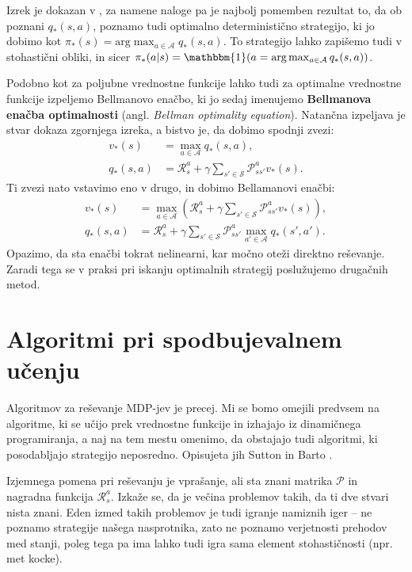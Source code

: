 \documentclass[12pt,a4paper]{amsart}
\theoremstyle{definition} %
\theoremstyle{plain} %
\begin{document}
Izrek je dokazan v \cite{RLalgo}, za namene naloge pa je najbolj pomemben rezultat to, da ob poznani 
$q_*(s, a)$, poznamo tudi optimalno deterministično strategijo, ki jo dobimo kot $\pi_*(s) = 
\text{arg}\max_{a \in \mathcal{A}} q_*(s, a)$. To strategijo lahko zapišemo tudi v stohastični obliki, 
in sicer $\pi_*(a|s) = \mathbbm{1} (a =\text{arg}\max_{a \in \mathcal{A}} q_*(s, a))$.

Podobno kot za poljubne vrednostne funkcije lahko tudi za optimalne vrednostne funkcije 
izpeljemo Bellmanovo enačbo, ki jo sedaj imenujemo \textbf{Bellmanova enačba optimalnosti} (angl. 
\textit{Bellman optimality equation}). Natančna izpeljava je stvar dokaza zgornjega izreka, a bistvo je, 
da dobimo spodnji zvezi:
\begin{align*}
    v_*(s) &= \max_{a \in \mathcal{A}} q_*(s, a), \\
    q_*(s, a) &= \mathcal{R}_s^a + \gamma \sum_{s' \in \mathcal{S}} \mathcal{P}_{ss'}^a v_*(s).
\end{align*}
Ti zvezi nato vstavimo eno v drugo, in dobimo Bellamanovi enačbi: 
\begin{align*}
    v_*(s) &= \max_{a \in \mathcal{A}} (\mathcal{R}_s^a + \gamma \sum_{s' \in \mathcal{S}} \mathcal{P}_{ss'}^a v_*(s)), \\
    q_*(s, a) &= \mathcal{R}_s^a + 
                \gamma \sum_{s' \in \mathcal{S}} \mathcal{P}_{ss'}^a \max_{a' \in \mathcal{A}} q_*(s', a').
\end{align*}
Opazimo, da sta enačbi tokrat nelinearni, kar močno oteži direktno reševanje. Zaradi tega se v praksi 
pri iskanju optimalnih strategij poslužujemo drugačnih metod.

\section{Algoritmi pri spodbujevalnem učenju}\label{algo}
\label{algoritmi}
Algoritmov za reševanje MDP-jev je precej. Mi se bomo omejili predvsem na algoritme, ki se učijo 
prek vrednostne funkcije in izhajajo iz dinamičnega programiranja, a naj na tem mestu omenimo, 
da obstajajo tudi algoritmi, ki posodabljajo strategijo neposredno. Opisujeta jih Sutton in Barto 
\cite{RLintro}.

Izjemnega pomena pri reševanju je vprašanje, ali sta znani matrika $\mathcal{P}$ in nagradna funkcija 
$\mathcal{R}_s^a$. Izkaže se, da je večina problemov takih, da ti dve stvari nista znani. Eden izmed 
takih problemov je tudi igranje namiznih iger -- ne poznamo strategije našega nasprotnika, zato ne 
poznamo verjetnosti prehodov med stanji, poleg tega pa ima lahko tudi igra sama element stohastičnosti 
(npr. met kocke).
\end{document}
